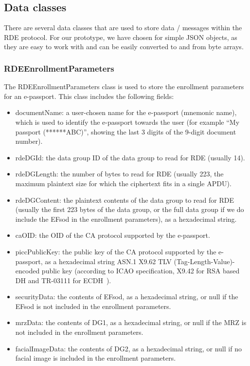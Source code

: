 \subsection{Data classes}\label{subsec:data-classes}
There are several data classes that are used to store data / messages within the RDE protocol.
For our prototype, we have chosen for simple JSON objects, as they are easy to work with and can be easily converted to and from byte arrays.

\subsubsection{\textsf{RDEEnrollmentParameters}}\label{subsubsec:rdeenrollmentparameters}
The \textsf{RDEEnrollmentParameters} class is used to store the enrollment parameters for an e-passport.
This class includes the following fields:
\begin{itemize}
    \item \textsf{documentName}: a user-chosen name for the e-passport (mnemonic name), which is used to identify the e-passport towards the user (for example ``\textsf{My passport (******ABC)}'', showing the last 3 digits of the 9-digit document number).
    \item \textsf{rdeDGId}: the data group ID of the data group to read for RDE (usually 14).
    \item \textsf{rdeDGLength}: the number of bytes to read for RDE (usually 223, the maximum plaintext size for which the ciphertext fits in a single APDU).
    \item \textsf{rdeDGContent}: the plaintext contents of the data group to read for RDE (usually the first 223 bytes of the data group, or the full data group if we do include the EFsod in the enrollment parameters), as a hexadecimal string.
    \item \textsf{caOID}: the OID of the CA protocol supported by the e-passport.
    \item \textsf{piccPublicKey}: the public key of the CA protocol supported by the e-passport, as a hexadecimal string ASN.1 X9.62 TLV (Tag-Length-Value)-encoded public key (according to ICAO specification, X9.42 for RSA based DH and TR-03111 for ECDH~\cite{icao9303securitymechanisms}).
    \item \textsf{securityData}: the contents of EFsod, as a hexadecimal string, or null if the EFsod is not included in the enrollment parameters.
    \item \textsf{mrzData}: the contents of DG1, as a hexadecimal string, or null if the MRZ is not included in the enrollment parameters.
    \item \textsf{facialImageData}: the contents of DG2, as a hexadecimal string, or null if no facial image is included in the enrollment parameters.
\end{itemize}

